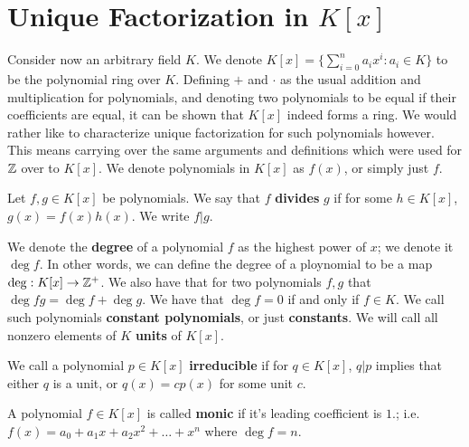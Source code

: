 
\section{Unique Factorization in $K[x]$}
\hspace{10mm}

Consider now an arbitrary field $K$. We denote $K[x]=\{\sum_{i=0}^{n} a_ix^i:a_i \in K\}$ to be the polynomial ring over $K$. Defining $+$ and $\cdot$ as the usual addition and multiplication for polynomials, and denoting two polynomials to be equal if their coefficients are equal, it can be shown that $K[x]$ indeed forms a ring. We would rather like to characterize unique factorization for such polynomials however. This means carrying over the same arguments and definitions which were used for $\mathbb{Z}$ over to $K[x]$. We denote polynomials in $K[x]$ as $f(x)$, or simply just $f$.

\begin{definition}
    Let $f,g \in K[x]$ be polynomials. We say that $f$ \textbf{divides} $g$ if for some $h \in K[x]$, $g(x)=f(x)h(x)$. We write $f|g$.
\end{definition}

We denote the \textbf{degree} of a polynomial $f$ as the highest power of $x$; we denote it $\deg{f}$. In other words, we can define the degree of a ploynomial to be a map $\deg:K[x] \rightarrow \mathbb{Z}^+$. We also have that for two polynomials $f,g$ that $\deg{fg}=\deg{f}+\deg{g}$. We have that $\deg{f}=0$ if and only if $f \in K$. We call such polynomials \textbf{constant polynomials}, or just \textbf{constants}. We will call all nonzero elements of $K$ \textbf{units} of $K[x]$.

\begin{definition}
    We call a polynomial $p \in K[x]$ \textbf{irreducible} if for $q \in K[x]$, $q|p$ implies that either $q$ is a unit, or $q(x)=cp(x)$ for some unit $c$.
\end{definition}

\begin{definition}
    A polynomial $f \in K[x]$ is called \textbf{monic} if it's leading coefficient is $1$.; i.e. $f(x)=a_0+a_1x+a_2x^2+ \dots + x^n$ where $\deg{f}=n$. 
\end{definition}

